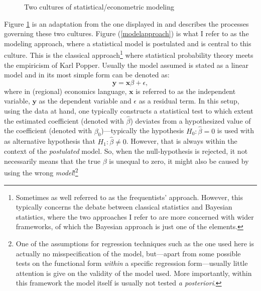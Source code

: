 \documentclass[fleqn,10pt]{SelfArx} %
\begin{document}
\begin{figure}[t!]\centering 
	\hfill
	
	\caption{Two cultures of statistical/econometric modeling \citep[inspired by][]{breiman2001statistical}}
	\label{fig:twocultures}
\end{figure}

Figure \ref{fig:twocultures} is an adaptation from the one displayed in \citet{breiman2001statistical} and describes the processes governing these two cultures. Figure (\ref{modelapproach}) is what I refer to as the modeling approach, where a statistical model is postulated and is central to this culture. This is the classical approach\footnote{Sometimes as well referred to as the frequentists' approach. However, this typically concerns the debate between classical statistics and Bayesian statistics, where the two approaches I refer to are more concerned with wider frameworks, of which the Bayesian approach is just one of the elements.} where statistical probability theory meets the empiricism of Karl Popper. Usually the model assumed is stated as a linear model and in its most simple form can be denoted as:
\begin{equation}
	\mathbf{y} = \mathbf{x}\beta + \epsilon, 
\end{equation}
where in (regional) economics language, $\mathbf{x}$ is referred to as the independent variable, $\mathbf{y}$ as the dependent variable and $\epsilon$ as a residual term. In this setup, using the data at hand, one typically constructs a statistical test to which extent the estimated coefficient (denoted with $\hat{\beta}$) deviates from a hypothesized value of the coefficient (denoted with $\beta_0$)---typically the hypothesis $H_0: \hat{\beta} = 0$ is used with as alternative hypothesis that $H_1: \hat{\beta} \neq 0$. However, that is always within the context of the \textit{postulated} model. So, when the null-hypothesis is rejected, it not necessarily means that the true $\beta$ is unequal to zero, it might also be caused by using the wrong \textit{model}!\footnote{One of the assumptions for regression techniques such as the one used here is actually no misspecification of the model, but---apart from some possible tests on the functional form \textit{within} a specific regression form---usually little attention is give on the validity of the model used. More importantly, within this framework the model itself is usually not tested \textit{a posteriori}.}
\end{document}
